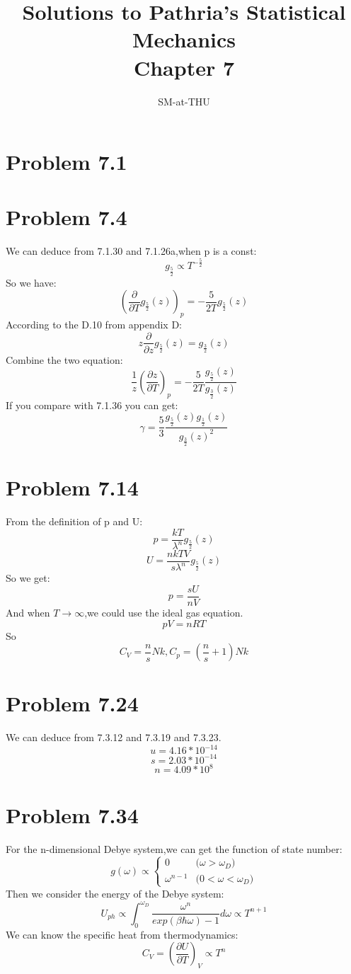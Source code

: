 \documentclass{article}
\author{SM-at-THU}
\title{\bf{Solutions to Pathria's Statistical Mechanics}\\Chapter 7}
\begin{document}
\maketitle
\section*{Problem 7.1}

\section*{Problem 7.4}
We can deduce from 7.1.30 and 7.1.26a,when p is a const:
$$g_{\frac{5}{2}}\propto T^{-\frac{5}{2}}$$
So we have:
$$(\frac{\partial}{\partial T}{g_{\frac{5}{2}}(z)})_p=-\frac{5}{2T}  g_{\frac{5}{2}}(z)$$
According to the D.10 from appendix D:
$$z\frac{\partial}{\partial z}g_{\frac{5}{2}}(z)=g_{\frac{3}{2}}(z)$$
Combine the two equation:
$$\frac{1}{z}(\frac{\partial z}{\partial T})_p=-\frac{5}{2T}\frac{g_{\frac{5}{2}}(z)}{g_{\frac{3}{2}}(z)}$$
If you compare with 7.1.36 you can get:
$$\gamma=\frac{5}{3}\frac{g_{\frac{5}{2}}(z)g_{\frac{1}{2}}(z)}{g_{\frac{3}{2}}(z)^2}$$


\section*{Problem 7.14}
From the definition of p and U:
$$p=\frac{kT}{\lambda ^n}g_{\frac{5}{2}}(z)$$
$$U=\frac{nkTV}{s\lambda ^n}g_{\frac{5}{2}}(z)$$
So we get:
$$p=\frac{sU}{nV}$$
And when $T\rightarrow\infty$,we could use the ideal gas equation.
$$pV=nRT$$
So
$$C_V=\frac{n}{s}Nk,C_p=(\frac{n}{s}+1)Nk$$


\section*{Problem 7.24}
We can deduce from 7.3.12 and 7.3.19 and 7.3.23.
$$u=4.16*10^{-14}$$
$$s=2.03*10^{-14}$$
$$n=4.09*10^{8}$$


\section*{Problem 7.34}
For the n-dimensional Debye system,we can get the function of  state number:
$$g(\omega)\propto
\begin{cases}
0& \text{($\omega>\omega_D$)}\\
\omega^{n-1}& \text{($0<\omega<\omega_D$)}
\end{cases}$$
Then we consider the energy of the Debye system:
$$U_{ph}\propto \int_0^{\omega_D}\frac{\omega^n}{exp(\beta\hbar\omega)-1}d\omega\propto T^{n+1}$$
We can know the specific heat from thermodynamics:
$$C_V=(\frac{\partial U}{\partial T})_V\propto T^n$$
\end{document}
